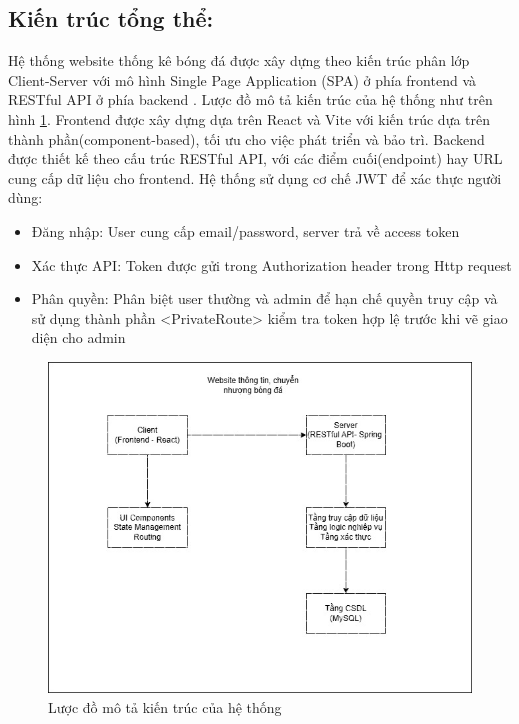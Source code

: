 \documentclass[../BTL.tex]{subfiles}
\begin{document}
\subsection{Kiến trúc tổng thể:}
Hệ thống website thống kê bóng đá được xây dựng theo kiến trúc phân lớp Client-Server với mô hình Single Page Application (SPA) ở phía frontend \cite{react-docs} \cite{antd-docs} và RESTful API ở phía backend\cite{hoidanit-restful} \cite{vanthoi-github}. Lược đồ mô tả kiến trúc của hệ thống như trên hình \ref{fig:web-overall-architecture}. Frontend được xây dựng dựa trên React và Vite với kiến trúc dựa trên thành phần(component-based), tối ưu cho việc phát triển và bảo trì. Backend được thiết kế theo cấu trúc RESTful API, với các điểm cuối(endpoint) hay URL cung cấp dữ liệu cho frontend. Hệ thống sử dụng cơ chế JWT để xác thực người dùng: 
\begin{itemize}
    \item Đăng nhập: User cung cấp email/password, server trả về access token
    \item Xác thực API: Token được gửi trong Authorization header trong Http request
    \item Phân quyền: Phân biệt user thường và admin để hạn chế quyền truy cập và sử dụng thành phần <PrivateRoute>  kiểm tra token hợp lệ trước khi vẽ giao diện cho admin
\end{itemize}


\begin{figure}
    \centering
    \includegraphics[width=1\linewidth]{Hinhve/web-overall-architecture.jpg}
    \caption{Lược đồ mô tả kiến trúc của hệ thống}
    \label{fig:web-overall-architecture}
\end{figure}
\end{document}

